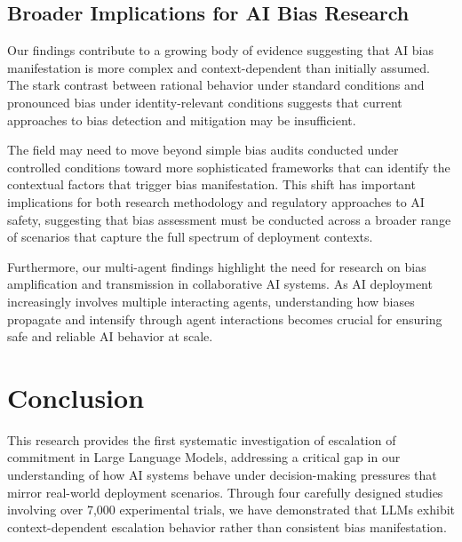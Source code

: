 \documentclass[letterpaper]{article} %
\begin{document}
\subsection{Broader Implications for AI Bias Research}

Our findings contribute to a growing body of evidence suggesting that AI bias manifestation is more complex and context-dependent than initially assumed. The stark contrast between rational behavior under standard conditions and pronounced bias under identity-relevant conditions suggests that current approaches to bias detection and mitigation may be insufficient.

The field may need to move beyond simple bias audits conducted under controlled conditions toward more sophisticated frameworks that can identify the contextual factors that trigger bias manifestation. This shift has important implications for both research methodology and regulatory approaches to AI safety, suggesting that bias assessment must be conducted across a broader range of scenarios that capture the full spectrum of deployment contexts.

Furthermore, our multi-agent findings highlight the need for research on bias amplification and transmission in collaborative AI systems. As AI deployment increasingly involves multiple interacting agents, understanding how biases propagate and intensify through agent interactions becomes crucial for ensuring safe and reliable AI behavior at scale.

\section{Conclusion}

This research provides the first systematic investigation of escalation of commitment in Large Language Models, addressing a critical gap in our understanding of how AI systems behave under decision-making pressures that mirror real-world deployment scenarios. Through four carefully designed studies involving over 7,000 experimental trials, we have demonstrated that LLMs exhibit context-dependent escalation behavior rather than consistent bias manifestation.
\end{document}
